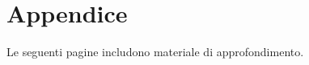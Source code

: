 \documentclass[12pt]{article}
\begin{document}

\newpage



\appendix
{}
\section*{Appendice}
Le seguenti pagine includono materiale di approfondimento.
\end{document}
